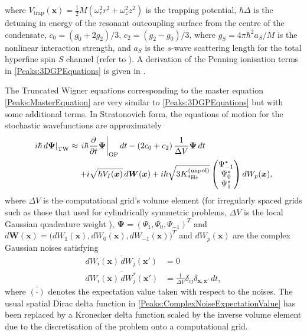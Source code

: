 where $\displaystyle V_\text{trap}(\bm{x}) = \frac{1}{2} M \left(\omega_r^2 r^2 + \omega_z^2 z^2 \right)$ is the trapping potential, $\hbar \Delta$ is the detuning in energy of the resonant outcoupling surface from the centre of the condensate, $c_0 = (g_0 + 2 g_2)/3$, $c_2 = (g_2 - g_0)/3$, where $g_S = 4 \pi \hbar^2 a_S/M$ is the nonlinear interaction strength, and $a_S$ is the $s$-wave scattering length for the total hyperfine spin $S$ channel (refer to ). A derivation of the Penning ionisation terms in \eqref{Peaks:3DGPEquations} is given in .

The Truncated Wigner equations corresponding to the master equation \eqref{Peaks:MasterEquation} are very similar to \eqref{Peaks:3DGPEquations} but with some additional terms. In Stratonovich form, the equations of motion for the stochastic wavefunctions are approximately
\begin{align}
    \label{Peaks:3DTWEquations}
    \begin{split}
        \left. i \hbar \,d\bm{\Psi}\right|_\text{TW} &\approx \left. i \hbar \frac{\partial }{\partial t}\bm{\Psi}\right|_\text{GP} dt - \left(2 c_0 + c_2 \right)\frac{1}{\Delta V}\bm{\Psi}\, dt\\
        &\relphantom{\approx} + i\sqrt{ \hbar V_I(\bm{x})} \,d\bm{W}(\bm{x}) + i \hbar\sqrt{3 \Kunpol}
        \begin{pmatrix}
            \Psi_{-1}^*\\
            \Psi_0^*\\
            \Psi_1^*
        \end{pmatrix} dW_p(\bm{x}),
    \end{split}
\end{align}
where $\Delta V$ is the computational grid's volume element (for irregularly spaced grids such as those that used for cylindrically symmetric problems, $\Delta V$ is the local Gaussian quadrature weight \citep{Ronen:2006}), $\bm{\Psi} = \left(\Psi_1, \Psi_0, \Psi_{-1} \right)^T$ and $d \bm{W}(\bm{x}) = \big(dW_1(\bm{x}), dW_0(\bm{x}), dW_{-1}(\bm{x})\big)^T$ and $dW_p(\bm{x})$ are the complex Gaussian noises satisfying
\begin{align}
    \overline{dW_i(\bm{x})\, dW_j(\bm{x}')} &= 0 \\
    \overline{dW_i(\bm{x})\, dW_j^*(\bm{x}')} &= \frac{1}{\Delta V}\delta_{ij}\delta_{\bm{x},\bm{x}'}\,dt, \label{Peaks:ComplexNoiseExpectationValue}
\end{align}
where $\overline{(\cdot)}$ denotes the expectation value taken with respect to the noises. The usual spatial Dirac delta function in \eqref{Peaks:ComplexNoiseExpectationValue} has been replaced by a Kronecker delta function scaled by the inverse volume element due to the discretisation of the problem onto a computational grid.


